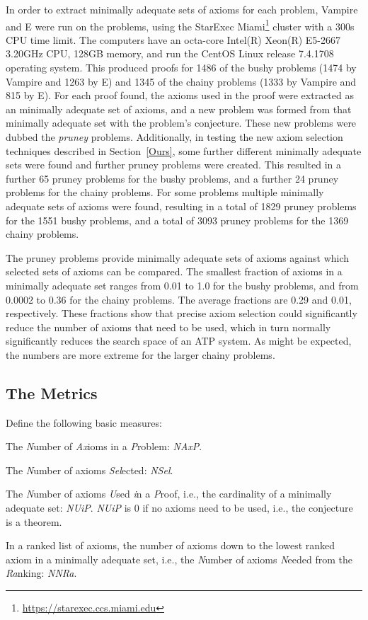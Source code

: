 \documentclass[EPiC]{easychair}
\newenvironment{packed_itemize}{
\vspace*{-0.5em}
\begin{itemize}
  \setlength{\partopsep}{0pt}
  \setlength{\itemsep}{1pt}
  \setlength{\parskip}{0pt}
  \setlength{\parsep}{0pt}
}{\end{itemize}}
\begin{document}
In order to extract minimally adequate sets of axioms for each problem, Vampire
and E \cite{SCV19} were run on the problems, using the StarExec \cite{SST14}
Miami\footnote{%
\url{https://starexec.ccs.miami.edu}}
cluster with a 300s CPU time limit.
The computers have an octa-core Intel(R) Xeon(R) E5-2667 3.20GHz CPU,
128GB memory, and run the CentOS Linux release 7.4.1708 operating system.
This produced proofs for 1486 of the bushy problems (1474 by Vampire and 1263
by E) and 1345 of the chainy problems (1333 by Vampire and 815 by E).
For each proof found, the axioms used in the proof were extracted as an
minimally adequate set of axioms, and a new problem was formed from that 
minimally adequate set with the problem's conjecture.
These new problems were dubbed the \emph{pruney} problems.
Additionally, in testing the new axiom selection techniques described in 
Section~\ref{Ours}, some further different minimally adequate sets were found 
and further pruney problems were created.
This resulted in a further 65 pruney problems for the bushy problems, and
a further 24 pruney problems for the chainy problems.
For some problems multiple minimally adequate sets of axioms were found, 
resulting in a total of 1829 pruney problems for the 1551 bushy problems, 
and a total of 3093 pruney problems for the 1369 chainy problems.

The pruney problems provide minimally adequate sets of axioms against which
selected sets of axioms can be compared.
The smallest fraction of axioms in a minimally adequate set ranges from 
0.01 to 1.0 for the bushy problems, and from 0.0002 to 0.36 for the chainy 
problems.
The average fractions are 0.29 and 0.01, respectively.
These fractions show that precise axiom selection could significantly reduce 
the number of axioms that need to be used, which in turn normally 
significantly reduces the search space of an ATP system.
As might be expected, the numbers are more extreme for the larger chainy 
problems.

\subsection{The Metrics}
\label{TheMetrics}

Define the following basic measures:
\begin{packed_itemize}
\item The \emph{N}umber of \emph{Ax}ioms in a \emph{P}roblem: \emph{NAxP}.
\item The \emph{N}umber of axioms \emph{Sel}ected: \emph{NSel}.
\item The \emph{N}umber of axioms \emph{U}sed \emph{i}n a \emph{P}roof, 
      i.e., the cardinality of a minimally adequate set: \emph{NUiP}.
      \emph{NUiP} is $0$ if no axioms need to be used, i.e., the conjecture 
      is a theorem.
\item In a ranked list of axioms, the number of axioms down to the lowest 
      ranked axiom in a minimally adequate set, i.e., the \emph{N}umber 
      of axioms \emph{N}eeded from the \emph{Ra}nking: \emph{NNRa}.
\end{packed_itemize}
\end{document}
